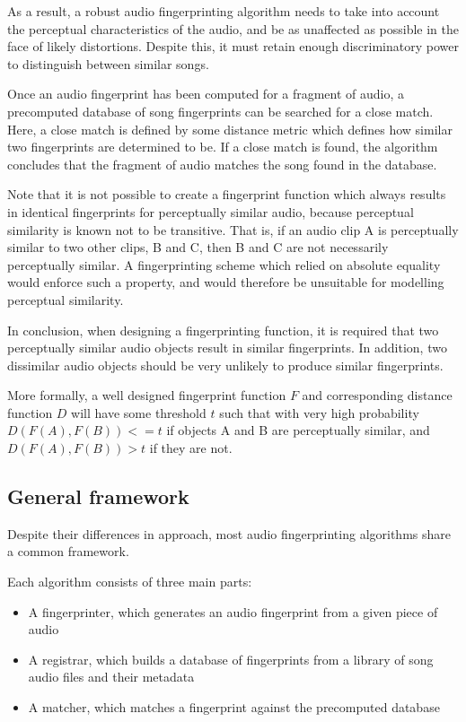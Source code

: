 \documentclass[12pt,a4paper,twoside,openright]{report}
\begin{document}
As a result, a robust audio fingerprinting algorithm needs to take into account the perceptual characteristics of the audio, and be as unaffected as possible in the face of likely distortions. Despite this, it must retain enough discriminatory power to distinguish between similar songs.

Once an audio fingerprint has been computed for a fragment of audio, a precomputed database of song fingerprints can be searched for a close match. Here, a close match is defined by some distance metric which defines how similar two fingerprints are determined to be. If a close match is found, the algorithm concludes that the fragment of audio matches the song found in the database.

Note that it is not possible to create a fingerprint function which always results in identical fingerprints for perceptually similar audio, because perceptual similarity is known not to be transitive. That is, if an audio clip A is perceptually similar to two other clips, B and C, then B and C are not necessarily perceptually similar. A fingerprinting scheme which relied on absolute equality would enforce such a property, and would therefore be unsuitable for modelling perceptual similarity.

In conclusion, when designing a fingerprinting function, it is required that two perceptually similar audio objects result in similar fingerprints. In addition, two dissimilar audio objects should be very unlikely to produce similar fingerprints. 

More formally, a well designed fingerprint function $F$ and corresponding distance function $D$ will have some threshold $t$ such that with very high probability $D(F(A),F(B)) <= t$ if objects A and B are perceptually similar, and $D(F(A),F(B)) > t$ if they are not.


\subsection{General framework}

Despite their differences in approach, most audio fingerprinting algorithms share a common framework.

Each algorithm consists of three main parts: 

\begin{itemize}
  \item A fingerprinter, which generates an audio fingerprint from a given piece of audio
  \item A registrar, which builds a database of fingerprints from a library of song audio files and their metadata
  \item A matcher, which matches a fingerprint against the precomputed database
\end{itemize}
\end{document}

